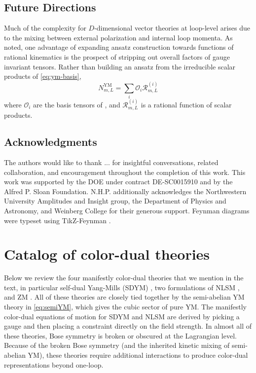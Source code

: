 \documentclass[11pt,letter]{article}
\begin{document}
\subsection{Future Directions}\label{sec:Discussion}

Much of the complexity for $D$-dimensional vector theories at
loop-level arises due to the mixing between external polarization and
internal loop momenta. As noted, one advantage of expanding ansatz
construction towards functions of rational kinematics is the prospect
of stripping out overall factors of gauge invariant tensors. Rather
than building an ansatz from the irreducible scalar products of
\cref{eq:ym-basis},
\begin{equation}
N^{\text{YM}}_{m,L} = \sum_i \mathcal{O}_i \mathcal{R}^{(i)}_{m,L}
\end{equation}
where $\mathcal{O}_i$ are the basis tensors of
\cite{Bern:2017tuc,Carrasco:2019yyn}, and $ \mathcal{R}^{(i)}_{m,L}$ is a
rational function of scalar products.

\subsection*{Acknowledgments}
The authors would like to thank ... for insightful conversations,
related collaboration, and encouragement throughout the completion of
this work. This work was supported by the DOE under contract
DE-SC0015910 and by the Alfred P. Sloan
Foundation. N.H.P. additionally acknowledges the Northwestern
University Amplitudes and Insight group, the Department of Physics and
Astronomy, and Weinberg College for their generous support.  Feynman
diagrams were typeset using TikZ-Feynman \cite{Ellis:2016jkw}.

\appendix
\section{Catalog of color-dual theories}
\label{sec:CKLagrangians}

Below we review the four manifestly color-dual theories that we mention in
the text, in particular self-dual Yang-Mills (SDYM) \cite{Monteiro2011pc}, two formulations of NLSM \cite{Cheung:2016prv,Cheung:2020djz,Cheung:2021zvb}, and ZM \cite{Zakharov:1973pp, Cheung:2022mix}.  All
of these theories are closely tied together by the semi-abelian YM
theory in \cref{eq:semiYM}, which gives the cubic sector of pure YM.
The manifestly color-dual equations of motion for SDYM and NLSM are
derived by picking a gauge and then placing a constraint directly on the
field strength. In almost all of these
theories, Bose symmetry is broken or obscured at the Lagrangian level.
Because of the broken Bose symmetry (and the inherited kinetic mixing
of semi-abelian YM), these theories require additional interactions to produce color-dual representations beyond one-loop.
\end{document}
